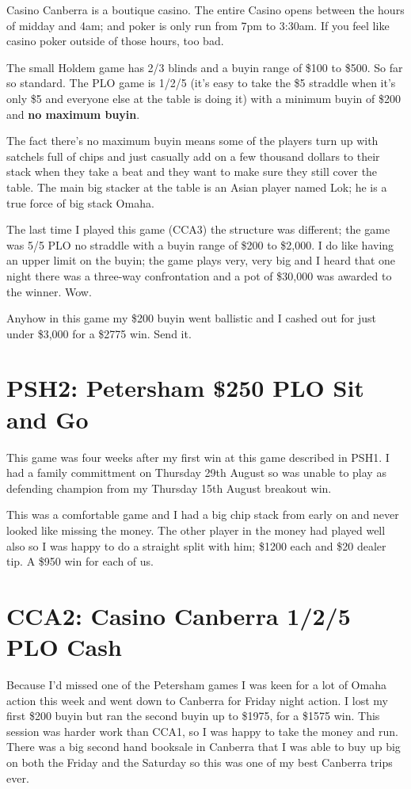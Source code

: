 Casino Canberra is a boutique casino. The entire Casino opens between
the hours of midday and 4am; and poker is only run from 7pm to
3:30am. If you feel like casino poker outside of those hours, too bad.

The small Holdem game has 2/3 blinds and a buyin range of \$100 to
\$500. So far so standard. The PLO game is 1/2/5 (it's easy to take
the \$5 straddle when it's only \$5 and everyone else at the table is
doing it) with a minimum buyin of \$200 and \textbf{no maximum buyin}.

The fact there's no maximum buyin means some of the players turn up
with satchels full of chips and just casually add on a few thousand
dollars to their stack when they take a beat and they want to make
sure they still cover the table. The main big stacker at the table is
an Asian player named Lok; he is a true force of big stack Omaha.

The last time I played this game (CCA3) the structure was different;
the game was 5/5 PLO no straddle with a buyin range of \$200 to
\$2,000. I do like having an upper limit on the buyin; the game plays
very, very big and I heard that one night there was a three-way
confrontation and a pot of \$30,000 was awarded to the winner. Wow.

Anyhow in this game my \$200 buyin went ballistic and I cashed out for
just under \$3,000 for a \$2775 win. Send it.

\section*{PSH2: Petersham \$250 PLO Sit and Go}

This game was four weeks after my first win at this game described in
PSH1. I had a family committment on Thursday 29th August so was unable
to play as defending champion from my Thursday 15th August breakout
win.

This was a comfortable game and I had a big chip stack from early on
and never looked like missing the money. The other player in the money
had played well also so I was happy to do a straight split with him;
\$1200 each and \$20 dealer tip. A \$950 win for each of us.

\section*{CCA2: Casino Canberra 1/2/5 PLO Cash}

Because I'd missed one of the Petersham games I was keen for a lot of
Omaha action this week and went down to Canberra for Friday night
action. I lost my first \$200 buyin but ran the second buyin up to
\$1975, for a \$1575 win. This session was harder work than CCA1, so I
was happy to take the money and run. There was a big second hand
booksale in Canberra that I was able to buy up big on both the Friday
and the Saturday so this was one of my best Canberra trips ever.

